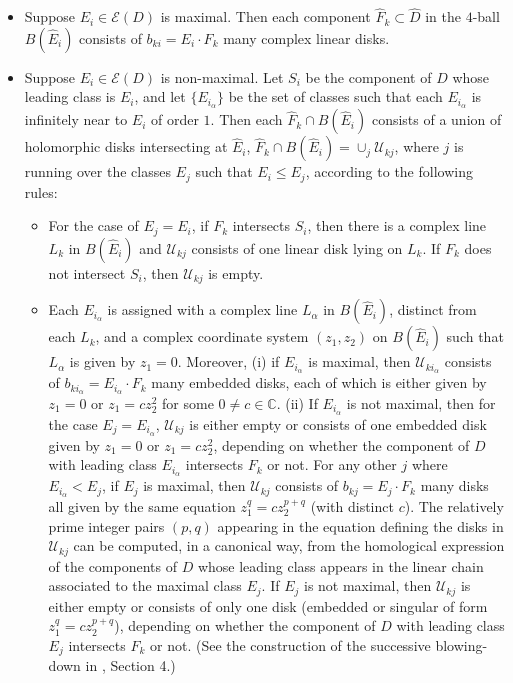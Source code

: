 \documentclass[11pt]{amsart}
\theoremstyle{plain}
\numberwithin{theorem}{section}
\theoremstyle{definition}
\newcommand{\C}{{\mathbb C}}
\newcommand{\U}{{\mathcal U}}
\newcommand{\E}{{\mathcal E}}
\begin{document}
\noindent{\bf Description of $\hat{D}$ near the points $\hat{E}_i$, where $E_i\in\E(D)$:}
\begin{itemize}
\item Suppose $E_i\in\E(D)$ is maximal. Then each component 
$\hat{F}_k\subset \hat{D}$ in the $4$-ball $B(\hat{E}_i)$ consists of $b_{ki}=E_i\cdot F_k$ many
complex linear disks. 
\item Suppose $E_i\in\E(D)$ is non-maximal. Let $S_i$ be the component of $D$ whose leading class is $E_i$, and let $\{E_{i_\alpha}\}$ be the set of classes such that each $E_{i_\alpha}$
is infinitely near to $E_i$ of order $1$. Then each $\hat{F}_k\cap B(\hat{E}_i)$ consists of a union of holomorphic disks intersecting at $\hat{E}_i$, $\hat{F}_k\cap B(\hat{E}_i)=\cup_j \U_{kj}$, where $j$ is running over the classes $E_j$ such that $E_i\leq E_j$, according to the following rules: 
\begin{itemize}
\item For the case of $E_j=E_i$, if $F_k$ intersects $S_i$, then there is a complex line $L_k$ in
$B(\hat{E}_i)$ and $\U_{kj}$ consists of one linear disk lying on $L_k$. If $F_k$ does not intersect $S_i$, then $\U_{kj}$ is empty. 
\item Each $E_{i_\alpha}$ is assigned with a complex line $L_\alpha$ in $B(\hat{E}_i)$, distinct from each $L_k$, and a complex coordinate system $(z_1,z_2)$ on $B(\hat{E}_i)$ such that $L_\alpha$
is given by $z_1=0$. Moreover, (i) if $E_{i_\alpha}$ is maximal, then $\U_{ki_\alpha}$
consists of $b_{ki_\alpha}=E_{i_\alpha}\cdot F_k$ many embedded disks, each of which is either given by $z_1=0$ or $z_1=cz_2^2$ for some $0\neq c\in\C$.
(ii) If $E_{i_\alpha}$ is not maximal, then for the case $E_j=E_{i_\alpha}$, $\U_{kj}$ is either empty or consists of one embedded disk given by $z_1=0$ or $z_1=cz_2^2$, depending on whether the component of $D$ with leading class $E_{i_\alpha}$ intersects $F_k$ or not. For any other $j$ where 
$E_{i_\alpha}<E_j$, if $E_j$ is maximal, then $\U_{kj}$ consists of $b_{kj}=E_j\cdot F_k$ many 
disks all given by the same equation $z_1^q=cz_2^{p+q}$ (with distinct $c$). 
The relatively prime integer pairs $(p,q)$ appearing in the equation defining the disks in $\U_{kj}$ can be computed,
in a canonical way, from the homological expression of the components of $D$ whose leading class appears in the linear chain associated to the maximal class $E_j$. If $E_j$ is not maximal, then $\U_{kj}$ is either empty or consists of only one disk (embedded or singular of form $z_1^q=cz_2^{p+q}$), depending on whether the component of $D$ with leading class $E_j$ intersects $F_k$ or not. 
(See the construction of the successive blowing-down in \cite{C1}, Section 4.)
\end{itemize}
\end{itemize}
\end{document}
